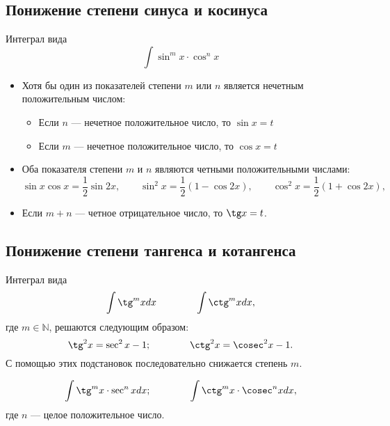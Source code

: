 \documentclass[a4paper,12pt,oneside]{extbook}
\theoremstyle{numbered}
\theoremstyle{unnumbered}
\theoremstyle{named}
\theoremstyle{unnumbered}
\theoremstyle{named}
\theoremstyle{named}
\theoremstyle{named}
\begin{document}
\subsection{Понижение степени синуса и косинуса}%
\label{sub:Понижение степени синуса и косинуса}

Интеграл вида
\begin{equation}
    \int \sin^m{x} \cdot \cos^n{x}
\end{equation}
\begin{itemize}
    \item Хотя бы один из показателей степени \(m\) или \(n\) является нечетным положительным числом:
          \begin{itemize}
              \item {Если \(n\) — нечетное положительное число, то \(\sin{x} = t\)}
              \item {Если \(m\) — нечетное положительное число, то \(\cos{x} = t\)}
          \end{itemize}
    \item Оба показателя степени \(m\) и \(n\) являются четными положительными числами:
          \begin{equation}
              \sin{x}\cos{x} = \frac{1}{2} \sin{2x},
              \qquad
              \sin^2{x} = \frac{1}{2}(1 - \cos{2x}),
              \qquad
              \cos^2{x} = \frac{1}{2}(1 + \cos{2x}),
          \end{equation}
    \item Если \(m + n\) — четное отрицательное число, то \(\tg x = t\).
\end{itemize}

\subsection{Понижение степени тангенса и котангенса}%
\label{sub:Понижение степени тангенса и котангенса}

Интеграл вида
\begin{gather*}
    \int \tg^m xdx
    \qquad \qquad
    \int \ctg^m xdx,
\end{gather*}
где \(m \in \mathbb{N}\), решаются следующим образом:
\begin{equation}
    \tg^2{x} = \sec^2{x} - 1;
    \qquad \qquad
    \ctg^2{x} = \cosec^2{x} - 1.
\end{equation}
С помощью этих подстановок последовательно снижается степень \(m\).

\begin{equation}
    \int \tg^m{x} \cdot \sec^n xdx;
    \qquad \qquad
    \int \ctg^m{x} \cdot \cosec^n xdx,
\end{equation}
где \(n\) — целое положительное число.
\end{document}
